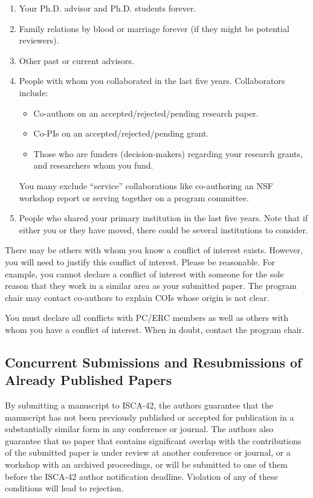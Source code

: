 \documentclass[pageno]{jpaper}
\begin{document}
\begin{enumerate}
\item Your Ph.D. advisor and Ph.D. students forever.
\item Family relations by blood or marriage forever (if they might be potential reviewers).
\item Other past or current advisors.
\item People with whom you collaborated in the last five years. Collaborators include:
\begin{itemize}
\item Co-authors on an accepted/rejected/pending research paper.
\item Co-PIs on an accepted/rejected/pending grant.
\item Those who are funders (decision-makers) regarding your research grants, and researchers whom you fund. 
\end{itemize}
You many exclude ``service'' collaborations like co-authoring an NSF
workshop report or serving together on a program committee.
\item People who shared your primary institution in the last five
years. Note that if either you or they have moved, there could be
several institutions to consider.
\end{enumerate}

There may be others with whom you know a conflict of interest exists.
However, you will need to justify this conflict of interest.  Please
be reasonable.  For example, you cannot declare a conflict of interest
with someone for the sole reason that they work in a similar area as
your submitted paper.  The program chair may contact co-authors to
explain COIs whose origin is not clear.

You must declare all conflicts with PC/ERC members as well as others
with whom you have a conflict of interest.  When in doubt, contact the
program chair.

\subsection{Concurrent Submissions and Resubmissions of Already Published Papers}

By submitting a manuscript to ISCA-42, the authors guarantee that the
manuscript has not been previously published or accepted for
publication in a substantially similar form in any conference or
journal. The authors also guarantee that no paper that contains
significant overlap with the contributions of the submitted paper is
under review at another conference or journal, or a workshop with an
archived proceedings, or will be submitted to one of them before the
ISCA-42 author notification deadline. Violation of any of these
conditions will lead to rejection.
\end{document}
